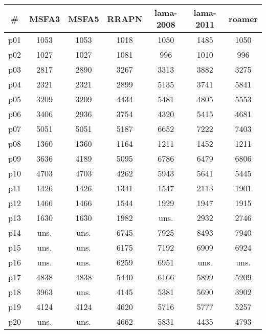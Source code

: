 \begin{tabular}{ccccccc}
\toprule
\textbf{\#} & \textbf{MSFA3} & \textbf{MSFA5} & \textbf{RRAPN} & \textbf{lama-2008} & \textbf{lama-2011} & \textbf{roamer}\\
\midrule
p01 & 1053 & 1053 & 1018 & 1050 & 1485 & 1050\\
p02 & 1027 & 1027 & 1081 & 996 & 1010 & 996\\
p03 & 2817 & 2890 & 3267 & 3313 & 3882 & 3275\\
p04 & 2321 & 2321 & 2899 & 5135 & 3741 & 5841\\
p05 & 3209 & 3209 & 4434 & 5481 & 4805 & 5553\\
p06 & 3406 & 2936 & 3754 & 4320 & 5415 & 4681\\
p07 & 5051 & 5051 & 5187 & 6652 & 7222 & 7403\\
p08 & 1360 & 1360 & 1164 & 1211 & 1452 & 1211\\
p09 & 3636 & 4189 & 5095 & 6786 & 6479 & 6806\\
p10 & 4703 & 4703 & 4262 & 5943 & 5641 & 5445\\
p11 & 1426 & 1426 & 1341 & 1547 & 2113 & 1901\\
p12 & 1466 & 1466 & 1544 & 1929 & 1947 & 1915\\
p13 & 1630 & 1630 & 1982 & uns. & 2932 & 2746\\
p14 & uns. & uns. & 6745 & 7925 & 8493 & 7940\\
p15 & uns. & uns. & 6175 & 7192 & 6909 & 6924\\
p16 & uns. & uns. & 6259 & 6951 & uns. & uns.\\
p17 & 4838 & 4838 & 5440 & 6166 & 5899 & 5209\\
p18 & 3963 & uns. & 4145 & 5381 & 5690 & 3902\\
p19 & 4124 & 4124 & 4620 & 5716 & 5777 & 5257\\
p20 & uns. & uns. & 4662 & 5831 & 4435 & 4793\\
\bottomrule
\end{tabular}

